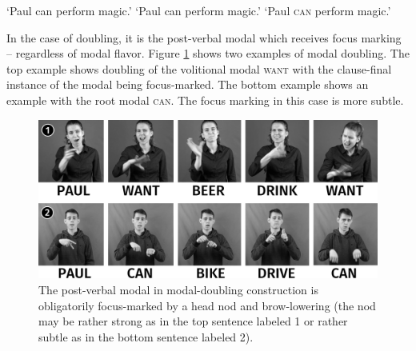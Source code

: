 \begin{exe}
\ex\begin{xlist} 

\glt `Paul can perform magic.' \label{ex:doublinga}
\glt `Paul can perform magic.' \label{ex:doublingb}
\ex {} 
\glt `Paul \textsc{can} perform magic.' \label{ex:doublingc} 

\end{xlist}
\end{exe} 

\noindent In the case of doubling, it is the post-verbal modal which receives focus marking -- regardless of modal flavor. Figure \ref{fig:modaldoubling} shows two examples of modal doubling. The top example shows doubling of the volitional modal \textsc{want} with the clause-final instance of the modal being focus-marked. The bottom example shows an example with the root modal \textsc{can}. The focus marking in this case is more subtle.



\begin{figure}[h]
\centering
	\includegraphics[width=1.0\textwidth]{modaldoublingsw.jpg}
	\caption{The post-verbal modal in modal-doubling construction is obligatorily focus-marked by a head nod and brow-lowering (the nod may be rather strong as in the top sentence labeled 1 or rather subtle as in the bottom sentence labeled 2).}
	\label{fig:modaldoubling}
\end{figure}



